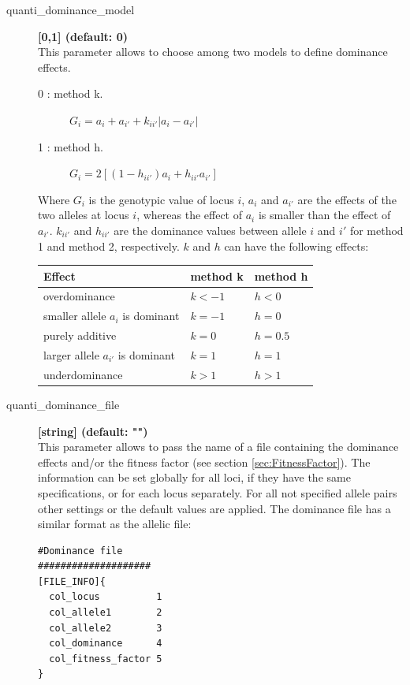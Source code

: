 \documentclass[letterpaper,12pt,oneside]{book}
\begin{document}
\begin{description}
\item [quanti\_dominance\_model] \textbf{[0,1] (default: 0)} \\
This parameter allows to choose among two models to define dominance
effects.
\begin{description}
\item [0 : method k.] $G_{i} = a_{i} + a_{i'} + k_{ii'}|a_{i} - a_{i'}|$
\item [1 : method h.] $G_{i} = 2[(1 - h_{ii'})a_{i} + h_{ii'}a_{i'}]$
\end{description}
Where $G_{i}$ is the genotypic value of locus $i$, $a_{i}$ and $a_{i'}$ are the effects of the two alleles at locus $i$, whereas the effect of $a_{i}$ is smaller than the effect of $a_{i'}$. $k_{ii'}$ and $h_{ii'}$ are the dominance values between allele $i$ and $i'$ for method 1 and method 2, respectively. $k$ and $h$ can have the following effects: \\

\begin{tabular}{lll}
\hline
Effect                                      & method k  & method h \\
\hline
overdominance                      & $k< -1$     & $h< 0$     \\
smaller allele $a_{i}$ is dominant &$ k = -1$        &$ h = 0 $       \\
purely additive         & $k = 0$         &$h =  0.5$      \\
larger allele $a_{i'}$ is dominant & $k = 1$         & $ h = 1$        \\
underdominance                     & $k > 1$     & $h > 1$    \\
\hline
\end{tabular}

\item[quanti\_dominance\_file] \textbf{[string] (default: "")}\\
This parameter allows to pass the name of a file containing the dominance effects and/or the fitness factor (see section \ref{sec:FitnessFactor}). The information can be set globally for all loci, if they have the same specifications, or for each locus separately. For all not specified allele pairs other settings or the default values are applied. The dominance file has a similar format as the allelic file:

\begin{lstlisting}[frame=single]
#Dominance file 
####################
[FILE_INFO]{
  col_locus          1
  col_allele1        2
  col_allele2        3
  col_dominance      4
  col_fitness_factor 5
}


\end{lstlisting}
\end{description}
\end{document}
